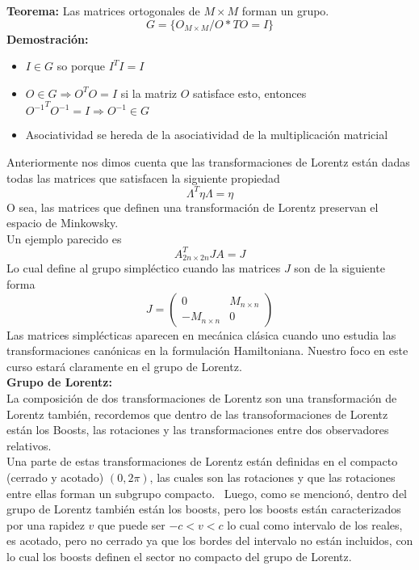 \documentclass[../main.tex]{subfiles}
\begin{document}
\textbf{Teorema:}
Las matrices ortogonales de $M\times M $ forman un grupo. 
\begin{equation*}
  G = \{O_{M\times M}/O*TO=I\}
\end{equation*}
\textbf{Demostración:}
 \begin{itemize}
   \item $I\in G$ so porque $I^TI=I$
   \item $O\in G \Rightarrow O^TO = I$ si la matriz $O$ satisface esto, entonces ${O^{-1}}^T O^{-1}=I\Rightarrow O^{-1}\in G$ 
   \item Asociatividad se hereda de la asociatividad de la multiplicación matricial
 \end{itemize}
Anteriormente nos dimos cuenta que las transformaciones de Lorentz están dadas todas las matrices que satisfacen la siguiente propiedad
\begin{equation}
  \Lambda^T\eta \Lambda = \eta
\end{equation}
O sea, las matrices que definen una transformación de Lorentz preservan el espacio de Minkowsky.\\
Un ejemplo parecido es
\begin{equation}
  A^T_{2n\times 2n} J A = J
\end{equation}
Lo cual define al grupo simpléctico cuando las matrices $J$ son de la siguiente forma
\begin{equation}
  J = \begin{pmatrix}
    0 & M_{n \times n} \\
    -M_{n \times n } & 0
  \end{pmatrix}
\end{equation}
Las matrices simplécticas aparecen en mecánica clásica cuando uno estudia las transformaciones canónicas en la formulación Hamiltoniana. Nuestro foco en este curso estará claramente en el grupo de Lorentz. \\
\textbf{Grupo de Lorentz:} \\
La composición de dos transformaciones de Lorentz son una transformación de Lorentz también, recordemos que dentro de las transoformaciones de Lorentz están los Boosts, las rotaciones y las transformaciones entre dos observadores relativos. \\
Una parte de estas transformaciones de Lorentz están definidas en el compacto (cerrado y acotado) $(0,2\pi)$, las cuales son las rotaciones y que las rotaciones entre ellas forman un subgrupo compacto. \
Luego, como se mencionó, dentro del grupo de Lorentz también están los boosts, pero los boosts están caracterizados por una rapidez $v$ que puede ser $-c<v<c$ lo cual como intervalo de los reales, es acotado, pero no cerrado ya que los bordes del intervalo no están incluidos, con lo cual los boosts definen el sector no compacto del grupo de Lorentz. \\
\end{document}
